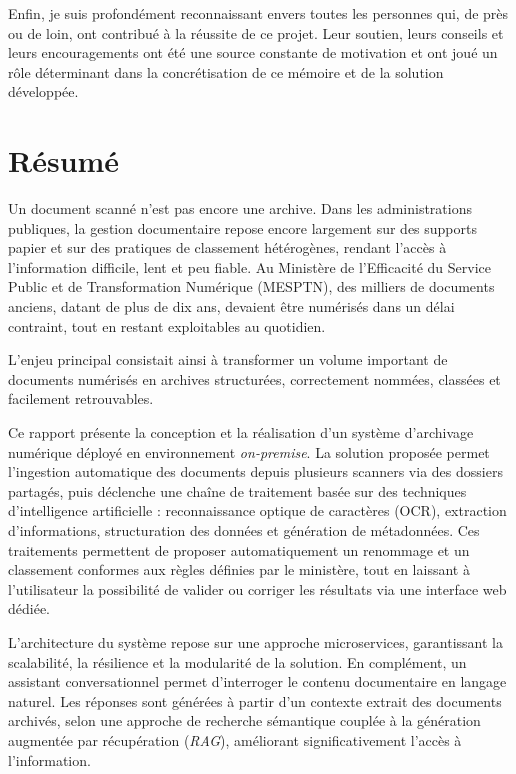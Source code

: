 \documentclass[12pt,a4paper]{report}
\newcommand{\nomMinistere}{Ministère de l'Efficacité du Service Public et de Transformation Numérique (MESPTN)}
\begin{document}
Enfin, je suis profondément reconnaissant envers toutes les personnes qui, de près ou de loin, ont contribué à la réussite de ce projet. Leur soutien, leurs conseils et leurs encouragements ont été une source constante de motivation et ont joué un rôle déterminant dans la concrétisation de ce mémoire et de la solution développée.

\clearpage
\chapter*{Résumé}
Un document scanné n’est pas encore une archive. Dans les administrations publiques, la gestion documentaire repose encore largement sur des supports papier et sur des pratiques de classement hétérogènes, rendant l’accès à l’information difficile, lent et peu fiable. Au \nomMinistere{}, des milliers de documents anciens, datant de plus de dix ans, devaient être numérisés dans un délai contraint, tout en restant exploitables au quotidien.

L’enjeu principal consistait ainsi à transformer un volume important de documents numérisés en archives structurées, correctement nommées, classées et facilement retrouvables.

Ce rapport présente la conception et la réalisation d’un système d’archivage numérique déployé en environnement \textit{on-premise}. La solution proposée permet l’ingestion automatique des documents depuis plusieurs scanners via des dossiers partagés, puis déclenche une chaîne de traitement basée sur des techniques d’intelligence artificielle : reconnaissance optique de caractères (OCR), extraction d’informations, structuration des données et génération de métadonnées. Ces traitements permettent de proposer automatiquement un renommage et un classement conformes aux règles définies par le ministère, tout en laissant à l’utilisateur la possibilité de valider ou corriger les résultats via une interface web dédiée.

L’architecture du système repose sur une approche microservices, garantissant la scalabilité, la résilience et la modularité de la solution. En complément, un assistant conversationnel permet d’interroger le contenu documentaire en langage naturel. Les réponses sont générées à partir d’un contexte extrait des documents archivés, selon une approche de recherche sémantique couplée à la génération augmentée par récupération (\textit{RAG}), améliorant significativement l’accès à l’information.
\end{document}
